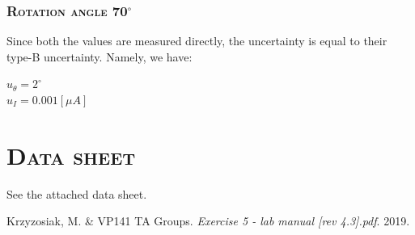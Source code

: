 \documentclass[a4paper,12pt]{article}
\begin{document}
\begin{appendices}
\subsubsection{\textsc{Rotation angle 70$^\circ$}}
Since both the values are measured directly, the uncertainty is equal to their type-B uncertainty. Namely, we have:
\begin{center}
$ u_{\theta} = 2^{\circ} $\\
$ u_I = 0.001 [\mu A] $
\end{center}


\newpage
\section{\textsc{Data sheet}} 
See the attached data sheet.
\end{appendices} 


\begin{thebibliography}{9}
 Krzyzosiak, M. \& VP141 TA Groups.
\textit{Exercise 5 - lab manual [rev 4.3].pdf}. 
2019.
\end{thebibliography}


\end{document}
